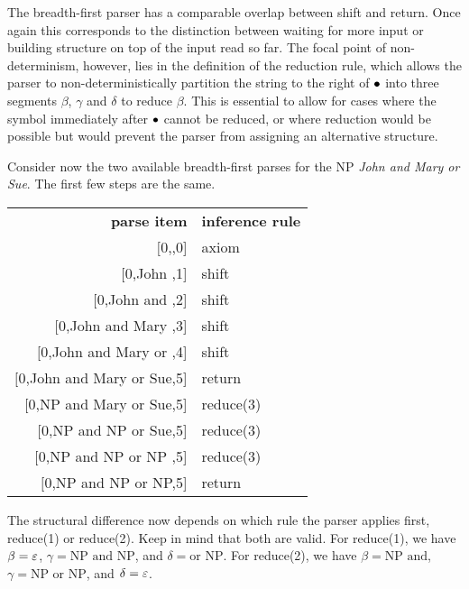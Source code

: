 The breadth-first parser has a comparable overlap between shift and return.
Once again this corresponds to the distinction between waiting for more input or building structure on top of the input read so far.
The focal point of non-determinism, however, lies in the definition of the reduction rule, which allows the parser to non-deterministically partition the string to the right of $\bullet$ into three segments $\beta$, $\gamma$ and $\delta$ to reduce $\beta$.
This is essential to allow for cases where the symbol immediately after $\bullet$ cannot be reduced, or where reduction would be possible but would prevent the parser from assigning an alternative structure.
%
\begin{examplebox}
    Consider now the two available breadth-first parses for the NP \emph{John and Mary or Sue}.
    The first few steps are the same.
    \begin{center}
        \begin{tabular}{r|l}
            \textbf{parse item}             & \textbf{inference rule}\\
            $\lbrack$0,\psep,0] & axiom\\
            $\lbrack$0,John \psep,1] & shift\\
            $\lbrack$0,John and \psep,2] & shift\\
            $\lbrack$0,John and Mary \psep,3] & shift\\
            $\lbrack$0,John and Mary or \psep,4] & shift\\
            $\lbrack$0,\psep John and Mary or Sue,5] & return\\
            $\lbrack$0,NP \psep and Mary or Sue,5] & reduce(3)\\
            $\lbrack$0,NP and NP \psep or Sue,5] & reduce(3)\\
            $\lbrack$0,NP and NP or NP \psep,5] & reduce(3)\\
            $\lbrack$0,\psep NP and NP or NP,5] & return\\
        \end{tabular}
    \end{center}
    The structural difference now depends on which rule the parser applies first, reduce(1) or reduce(2). 
    Keep in mind that both are valid.
    For reduce(1), we have $\beta = \varepsilon$, $\gamma = \text{NP and NP}$, and $\delta = \text{or NP}$.
    For reduce(2), we have $\beta = \text{NP and}$, $\gamma = \text{NP or NP}$, and $\delta = \varepsilon$.

\end{examplebox}
